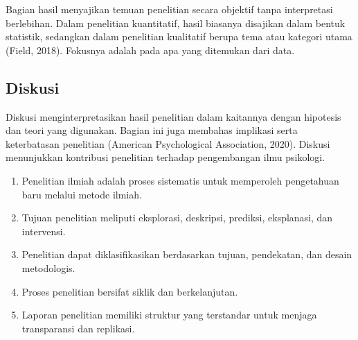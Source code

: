 \documentclass[
  indonesian,
  letterpaper,
  DIV=11,
  numbers=noendperiod]{scrreprt}
\providecommand{\tightlist}{%
  \setlength{\itemsep}{0pt}\setlength{\parskip}{0pt}}
\begin{document}
Bagian hasil menyajikan temuan penelitian secara objektif tanpa
interpretasi berlebihan. Dalam penelitian kuantitatif, hasil biasanya
disajikan dalam bentuk statistik, sedangkan dalam penelitian kualitatif
berupa tema atau kategori utama (Field, 2018). Fokusnya adalah pada apa
yang ditemukan dari data.

\subsection{Diskusi}\label{diskusi}

Diskusi menginterpretasikan hasil penelitian dalam kaitannya dengan
hipotesis dan teori yang digunakan. Bagian ini juga membahas implikasi
serta keterbatasan penelitian (American Psychological Association,
2020). Diskusi menunjukkan kontribusi penelitian terhadap pengembangan
ilmu psikologi.

\begin{tcolorbox}[enhanced jigsaw, colframe=quarto-callout-tip-color-frame, toptitle=1mm, breakable, leftrule=.75mm, arc=.35mm, toprule=.15mm, colback=white, colbacktitle=quarto-callout-tip-color!10!white, bottomtitle=1mm, bottomrule=.15mm, titlerule=0mm, title=\textcolor{quarto-callout-tip-color}{\faLightbulb}\hspace{0.5em}{Rangkuman}, coltitle=black, left=2mm, opacitybacktitle=0.6, opacityback=0, rightrule=.15mm]

\begin{enumerate}
\def\labelenumi{\arabic{enumi}.}
\tightlist
\item
  Penelitian ilmiah adalah proses sistematis untuk memperoleh
  pengetahuan baru melalui metode ilmiah.
\item
  Tujuan penelitian meliputi eksplorasi, deskripsi, prediksi,
  eksplanasi, dan intervensi.
\item
  Penelitian dapat diklasifikasikan berdasarkan tujuan, pendekatan, dan
  desain metodologis.
\item
  Proses penelitian bersifat siklik dan berkelanjutan.
\item
  Laporan penelitian memiliki struktur yang terstandar untuk menjaga
  transparansi dan replikasi.
\end{enumerate}

\end{tcolorbox}
\end{document}
